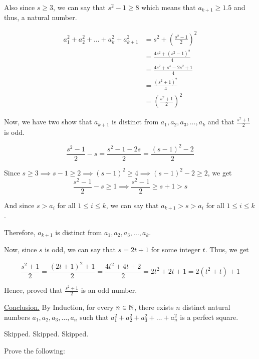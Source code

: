 Also since $s \geq 3$, we can say that $s^2 - 1 \geq 8$ which means that $a_{k+1} \geq 1.5$ and thus, a natural number.

\begin{align*}
a_1^2 + a_2^2 + \ldots +a_k^2 + a_{k+1}^2 
 &= s^2 + \left( \frac{s^2-1}{2} \right)^2 \\
 &= \frac{4s^2 + (s^2-1)^2}{4} \\
 &= \frac{4s^2 + s^4 - 2s^2 + 1}{4} \\
 &= \frac{(s^2+1)^2}{4} \\
 &= \left( \frac{s^2+1}{2} \right)^2
\end{align*}

Now, we have two show that $a_{k+1}$ is distinct from $a_1, a_2, a_3, \ldots, a_k$ and that $\displaystyle \frac{s^2+1}{2}$ is odd.

$$\frac{s^2-1}{2} - s = \frac{s^2-1-2s}{2} = \frac{(s-1)^2 - 2}{2}$$

Since $s \geq 3 \implies s-1 \geq 2 \implies (s-1)^2 \geq 4 \implies (s-1)^2 - 2 \geq 2$, we get
$$\frac{s^2-1}{2} - s \geq 1 \implies \frac{s^2-1}{2} \geq s+1 > s$$

And since $s > a_i$ for all $1 \leq i \leq k$, we can say that $a_{k+1} > s > a_i$ for all $1 \leq i \leq k$.

Therefore, $a_{k+1}$ is distinct from $a_1, a_2, a_3, \ldots, a_k$.

Now, since $s$ is odd, we can say that $s = 2t+1$ for some integer $t$. Thus, we get

$$\frac{s^2+1}{2} = \frac{(2t+1)^2+1}{2} = \frac{4t^2 + 4t + 2}{2} = 2t^2  + 2t + 1 = 2(t^2+t)+1$$

Hence, proved that $\displaystyle \frac{s^2+1}{2}$ is an odd number.

\underline{Conclusion.} By Induction, for every $n \in \mathbb{N}$, there exists $n$ distinct natural numbers $a_1, a_2, a_3, \ldots, a_n$ such that $a_1^2 + a_2^2 + a_3^2 + \ldots + a_n^2$ is a perfect square.

\es

\bp Skipped. \ep
\bp Skipped. \ep
\bp Skipped. \ep

\bp
Prove the following:

